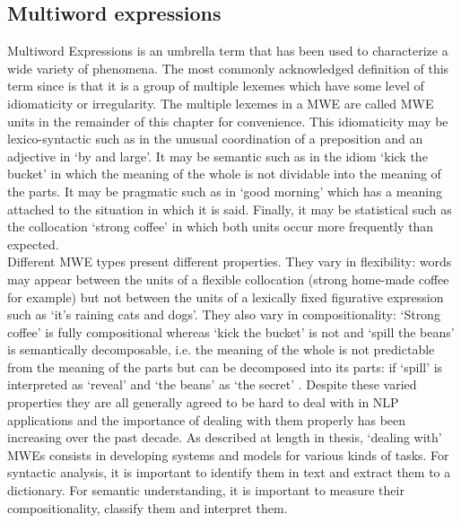 \documentclass[output=paper]{LSP/langsci}
\begin{document}
\subsection{Multiword expressions}
\label{MWEs}
\indent Multiword Expressions is an umbrella term that has been used to characterize a wide variety of phenomena. The most commonly acknowledged definition of this term since \citet{sag02} is that it is a group of multiple lexemes which have some level of idiomaticity or irregularity. The multiple lexemes in a MWE are called MWE units in the remainder of this chapter for convenience. This idiomaticity may be lexico-syntactic such as in the unusual coordination of a preposition and an adjective in `by and large'. It may be semantic such as in the idiom `kick the bucket' in which the meaning of the whole is not dividable into the meaning of the parts. It may be pragmatic such as in `good morning' which has a meaning attached to the situation in which it is said. Finally, it may be statistical such as the collocation `strong coffee' in which both units occur more frequently than expected.\\
\indent Different MWE types present different properties. They vary in flexibility: words may appear between the units of a flexible collocation (strong home-made coffee for example) but not between the units of a lexically fixed figurative expression such as `it's raining cats and dogs'. They also vary in compositionality: `Strong coffee' is fully compositional whereas `kick the bucket' is not and `spill the beans' is semantically decomposable, i.e. the meaning of the whole is not predictable from the meaning of the parts but can be decomposed into its parts: if `spill' is interpreted as `reveal' and `the beans' as `the secret' \citep{nunberg94}.
Despite these varied properties they are all generally agreed to be hard to deal with in NLP applications \citep{sag02} and the importance of dealing with them properly has been increasing over the past decade. As described at length in  thesis, `dealing with' MWEs consists in developing systems and models for various kinds of tasks. For syntactic analysis, it is important to identify them in text and extract them to a dictionary. For semantic understanding, it is important to measure their compositionality, classify them and interpret them.
\end{document}
